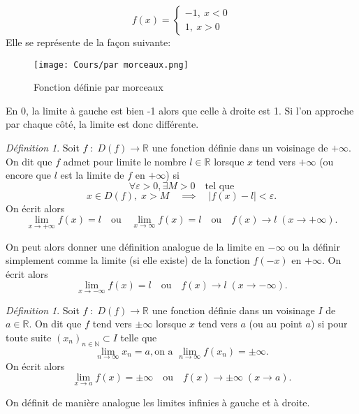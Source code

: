 \documentclass[oneside,12pt,french,table]{book}
\theoremstyle{definition}
\theoremstyle{plain}
\theoremstyle{remark}
\newtheorem{defi}[definition]{Définition}
\newcommand{\Nn}{{\mathbb{N}}}
\newcommand{\Rr}{{\mathbb{R}}}
\begin{document}
\begin{equation}
    f(x)=\begin{cases}
        -1, ~ x< 0\\
        1,~ x>0
    \end{cases}
\end{equation}
Elle se représente de la façon suivante:
\begin{figure}[H]
    \centering
    \texttt{[image: Cours/par morceaux.png]}
    \caption{Fonction définie par morceaux    }
    \label{fig:Cours/par morceaux.png}
\end{figure}
En 0, la limite à gauche est bien -1 alors que celle à droite est 1. Si l'on approche par chaque côté, la limite est donc différente.
\begin{defi}
    Soit $f\;:\;D(f)\longrightarrow\Rr$ une fonction définie dans un voisinage de $+\infty$.
    On dit que $f$ admet pour limite le nombre $l\in\Rr$ lorsque $x$ tend vers $+\infty$ (ou encore que $l$ est la limite de $f$ en $+\infty$) si
     \[
    \forall \varepsilon>0,\exists M>0 \quad\text{tel que}
    \]
    \[
    x\in D(f), \;x>M \quad \implies \quad |f(x)-l|<\varepsilon .
    \]
    On écrit alors \[
    \lim_{x\rightarrow +\infty}f(x)=l \quad \text{ou} \quad \lim_{x\rightarrow \infty}f(x)=l \quad \text{ou} \quad f(x)\longrightarrow l \; (x\rightarrow +\infty).
    \]
\end{defi}
On peut alors donner une définition analogue de la limite en $-\infty$ ou la définir simplement comme la limite (si elle existe) de la fonction $f(-x)$ en $+\infty$. On écrit alors \[
\lim_{x\rightarrow -\infty}f(x)=l \quad \text{ou} \quad f(x)\longrightarrow l \; (x\rightarrow -\infty).
\]
\begin{defi}
     Soit $f\;:\;D(f)\longrightarrow\Rr$ une fonction définie dans un voisinage $I$ de $a\in\Rr$. On dit que $f$ tend vers $\pm\infty$ lorsque $x$ tend vers $a$ (ou au point $a$) si pour toute suite $(x_n)_{n \in \Nn } \subset I$ telle que 
     \[
     \lim_{n\rightarrow \infty}x_n=a, \text{on a } \lim_{n\rightarrow \infty}f(x_n)=\pm\infty.
     \]
     On écrit alors \[
     \lim_{x\rightarrow a }f(x)=\pm\infty \quad \text{ou} \quad f(x)\longrightarrow\pm\infty \; (x\rightarrow a).
     \]
\end{defi}

On définit de manière analogue les limites infinies à gauche et à droite.
\end{document}
